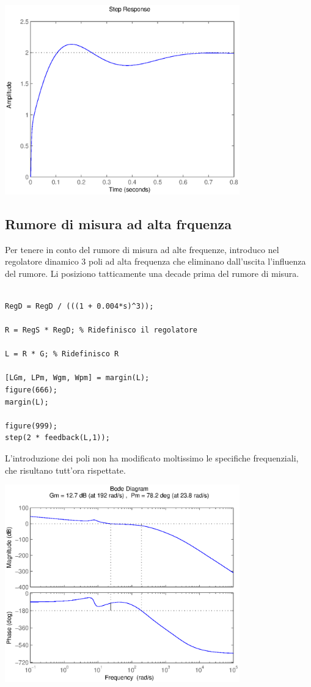\documentclass{article}
\begin{document}
\includegraphics [width=4in]{prog6RADICI_12.eps}


\subsection*{Rumore di misura ad alta frquenza}

\begin{par}
Per tenere in conto del rumore di misura ad alte frequenze, introduco
nel regolatore dinamico 3 poli ad alta frequenza che eliminano
dall'uscita l'influenza del rumore.
Li posiziono tatticamente una decade prima del rumore di misura.
\end{par}
\begin{verbatim}

RegD = RegD / (((1 + 0.004*s)^3));

R = RegS * RegD; % Ridefinisco il regolatore

L = R * G; % Ridefinisco R

[LGm, LPm, Wgm, Wpm] = margin(L);
figure(666);
margin(L);

figure(999);
step(2 * feedback(L,1));
\end{verbatim}
\begin{par}
L'introduzione dei poli non ha modificato moltissimo le specifiche frequenziali, che risultano tutt'ora rispettate.

\end{par}

\includegraphics [width=4in]{prog6RADICI_13.eps}
\end{document}
